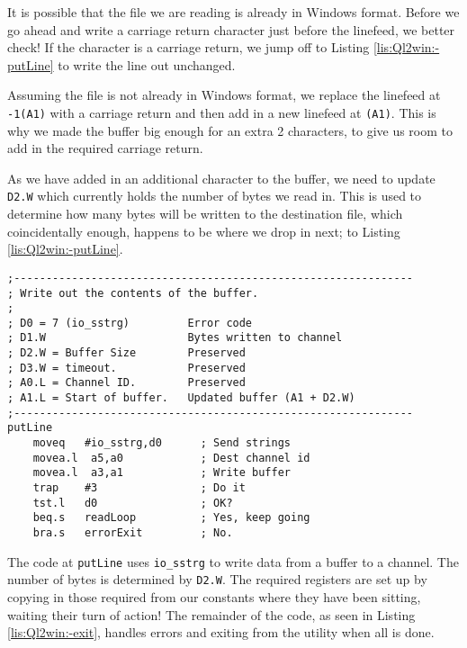 It is possible that the file we are reading is already in Windows
format. Before we go ahead and write a carriage return character just
before the linefeed, we better check! If the character is a carriage
return, we jump off to Listing \ref{lis:Ql2win:-putLine} to write
the line out unchanged.

Assuming the file is not already in Windows format, we replace the
linefeed at \lstinline[basicstyle={\ttfamily},showstringspaces=false]!-1(A1)!
with a carriage return and then add in a new linefeed at \lstinline[basicstyle={\ttfamily},showstringspaces=false]!(A1)!.
This is why we made the buffer big enough for an extra 2 characters,
to give us room to add in the required carriage return.

As we have added in an additional character to the buffer, we need
to update \lstinline[basicstyle={\ttfamily},showstringspaces=false]!D2.W!
which currently holds the number of bytes we read in. This is used
to determine how many bytes will be written to the destination file,
which coincidentally enough, happens to be where we drop in next;
to Listing \ref{lis:Ql2win:-putLine}.

\begin{lstlisting}[caption={Ql2win: putLine},label={lis:Ql2win:-putLine},firstnumber=131]
;--------------------------------------------------------------
; Write out the contents of the buffer.
;
; D0 = 7 (io_sstrg)         Error code
; D1.W                      Bytes written to channel
; D2.W = Buffer Size        Preserved
; D3.W = timeout.           Preserved
; A0.L = Channel ID.        Preserved
; A1.L = Start of buffer.   Updated buffer (A1 + D2.W)
;--------------------------------------------------------------
putLine
    moveq   #io_sstrg,d0      ; Send strings
    movea.l  a5,a0            ; Dest channel id
    movea.l  a3,a1            ; Write buffer
    trap    #3                ; Do it
    tst.l   d0                ; OK?
    beq.s   readLoop          ; Yes, keep going 
    bra.s   errorExit         ; No.
\end{lstlisting}

The code at \lstinline[basicstyle={\ttfamily},showstringspaces=false]!putLine!
uses \lstinline[basicstyle={\ttfamily},showstringspaces=false]!io_sstrg!
to write data from a buffer to a channel. The number of bytes is determined
by \lstinline[basicstyle={\ttfamily},showstringspaces=false]!D2.W!.
The required registers are set up by copying in those required from
our constants where they have been sitting, waiting their turn of
action! The remainder of the code, as seen in Listing \ref{lis:Ql2win:-exit},
handles errors and exiting from the utility when all is done.

